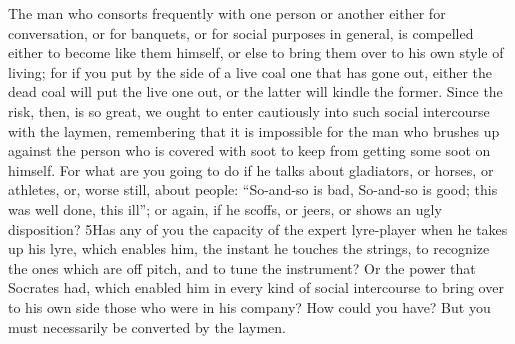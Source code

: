 The man who consorts frequently with one person or another either for conversation, or for banquets, or for social purposes in general, is compelled either to become like them himself, or else to bring them over to his own style of living; for if you put by the side of a live coal one that has gone out, either the dead coal will put the live one out, or the latter will kindle the former. Since the risk, then, is so great, we ought to enter cautiously into such social intercourse with the laymen, remembering that it is impossible for the man who brushes up against the person who is covered with soot to keep from getting some soot on himself. For what are you going to do if he talks about gladiators, or horses, or athletes, or, worse still, about people: ``So-and-so is bad, So-and-so is good; this was well done, this ill''; or again, if he scoffs, or jeers, or shows an ugly disposition? 5Has any of you the capacity of the expert lyre-player when he takes up his lyre, which enables him, the instant he touches the strings, to recognize the ones which are off pitch, and to tune the instrument? Or the power that Socrates had, which enabled him in every kind of social intercourse to bring over to his own side those who were in his company? How could you have? But you must necessarily be converted by the laymen.

